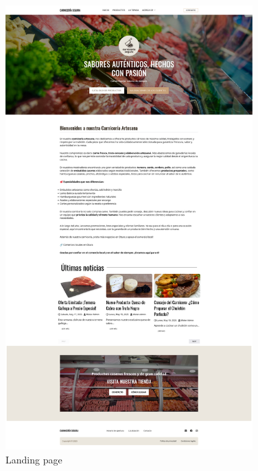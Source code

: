 \documentclass[a4paper]{article}
\begin{document}
\begin{figure}[H]
    \centering
    \includegraphics[width=0.85\textwidth]{images/template-1.png}
    \caption{Landing page}
\end{figure}
\end{document}
